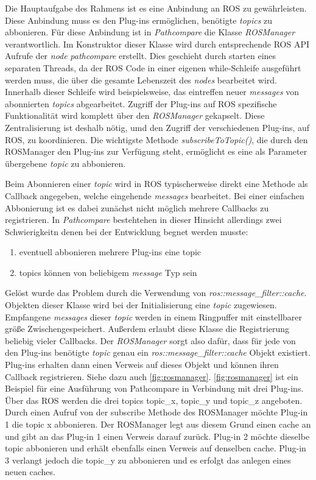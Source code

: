 Die Hauptaufgabe des Rahmens ist es eine Anbindung an ROS zu gewährleisten.
Diese Anbindung muss es den Plug-ins ermöglichen, benötigte \textit{topics} zu
abbonieren. Für diese Anbindung ist in \textit{Pathcompare} die Klasse
\textit{ROSManager} verantwortlich. Im Konstruktor dieser Klasse wird durch
entsprechende ROS API Aufrufe der \textit{node} \textit{pathcompare}
erstellt. Dies geschieht durch starten eines separaten Threads, da der ROS Code
in einer eigenen while-Schleife ausgeführt werden muss, die über die gesamte
Lebenszeit des \textit{nodes} bearbeitet wird. Innerhalb dieser Schleife wird
beispielsweise, das eintreffen neuer \textit{messages} von abonnierten
\textit{topics} abgearbeitet.
Zugriff der Plug-ins auf ROS spezifische Funktionalität wird komplett über den
\textit{ROSManager} gekapselt. Diese Zentralisierung ist deshalb nötig, umd den Zugriff
der verschiedenen Plug-ins, auf ROS, zu koordinieren. 
Die wichtigste Methode \textit{subscribeToTopic()}, die durch den ROSManager den Plug-ins zur
Verfügung steht, ermöglicht es eine als Parameter übergebene \textit{topic} zu
abbonieren. 


Beim Abonnieren einer \textit{topic} wird in ROS typischerweise direkt eine
Methode als Callback angegeben, welche eingehende \textit{messages} bearbeitet.
Bei einer einfachen Abbonierung ist es dabei zunächst nicht möglich mehrere
Callbacks zu registrieren.
In \textit{Pathcompare} bestehtehen in dieser Hinsicht allerdings zwei
Schwierigkeitn denen bei der Entwicklung begnet werden musste:

\begin{enumerate}
  \item eventuell abbonieren mehrere Plug-ins eine topic
  \item topics können von beliebigem \textit{message} Typ sein
\end{enumerate}

Gelöst wurde das Problem durch die Verwendung von
\textit{ros::message\_filter::cache}. Objekten dieser Klasse wird bei der
Initialisierung eine \textit{topic} zugewiesen. Empfangene \textit{messages}
dieser \textit{topic} werden in einem Ringpuffer mit einstellbarer größe
Zwischengespeichert.  Außerdem erlaubt diese Klasse die Registrierung beliebig
vieler Callbacks.  Der \textit{ROSManager} sorgt also dafür, dass für jede von
den Plug-ins benötigte \textit{topic} genau ein
\textit{ros::message\_filter::cache} Objekt existiert. Plug-ins erhalten dann
einen Verweis auf dieses Objekt und können ihren Callback registrieren. Siehe
dazu auch \autoref{fig:rosmanager}.
\autoref{fig:rosmanager} ist ein Beispiel für eine Ausführung von Pathcompare
in Verbindung mit drei Plug-ins. Über das ROS werden die drei topics topic\_x,
topic\_y und topic\_z angeboten. Durch einen Aufruf von der subscribe Methode
des ROSManager möchte Plug-in 1 die topic x abbonieren. Der ROSManager legt aus
diesem Grund einen cache an und gibt an das Plug-in 1 einen Verweis darauf
zurück. Plug-in 2 möchte dieselbe topic abbonieren und erhält ebenfalls einen
Verweis auf denselben cache. Plug-in 3 verlangt jedoch die topic\_y zu
abbonieren und es erfolgt das anlegen eines neuen caches. 

